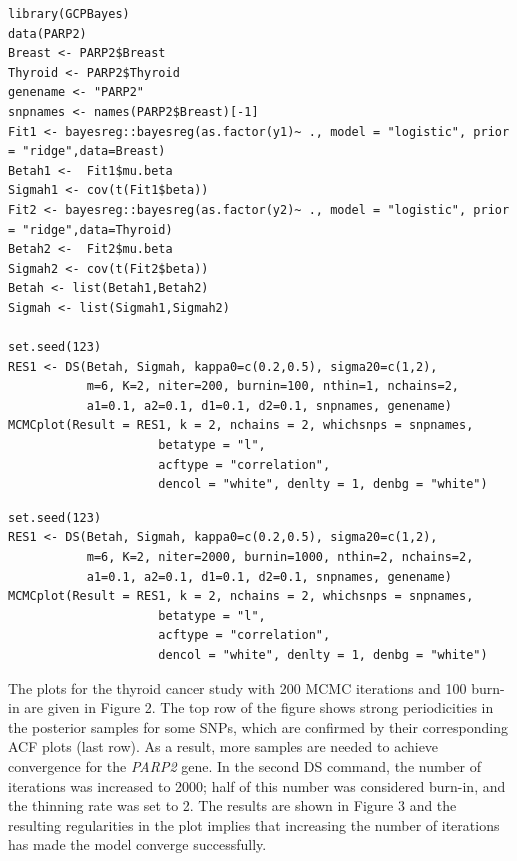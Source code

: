 \begin{verbatim}
library(GCPBayes)
data(PARP2)
Breast <- PARP2$Breast
Thyroid <- PARP2$Thyroid
genename <- "PARP2"
snpnames <- names(PARP2$Breast)[-1]
Fit1 <- bayesreg::bayesreg(as.factor(y1)~ ., model = "logistic", prior = "ridge",data=Breast)
Betah1 <-  Fit1$mu.beta
Sigmah1 <- cov(t(Fit1$beta))
Fit2 <- bayesreg::bayesreg(as.factor(y2)~ ., model = "logistic", prior = "ridge",data=Thyroid)
Betah2 <-  Fit2$mu.beta
Sigmah2 <- cov(t(Fit2$beta))
Betah <- list(Betah1,Betah2)
Sigmah <- list(Sigmah1,Sigmah2)

set.seed(123)
RES1 <- DS(Betah, Sigmah, kappa0=c(0.2,0.5), sigma20=c(1,2),
           m=6, K=2, niter=200, burnin=100, nthin=1, nchains=2,
           a1=0.1, a2=0.1, d1=0.1, d2=0.1, snpnames, genename)
MCMCplot(Result = RES1, k = 2, nchains = 2, whichsnps = snpnames,
                     betatype = "l",
                     acftype = "correlation",
                     dencol = "white", denlty = 1, denbg = "white")
\end{verbatim}

\begin{verbatim}
set.seed(123)
RES1 <- DS(Betah, Sigmah, kappa0=c(0.2,0.5), sigma20=c(1,2),
           m=6, K=2, niter=2000, burnin=1000, nthin=2, nchains=2,
           a1=0.1, a2=0.1, d1=0.1, d2=0.1, snpnames, genename)
MCMCplot(Result = RES1, k = 2, nchains = 2, whichsnps = snpnames,
                     betatype = "l",
                     acftype = "correlation",
                     dencol = "white", denlty = 1, denbg = "white")
\end{verbatim}

The plots for the thyroid cancer study with 200 MCMC iterations and 100 burn-in are given in Figure 2.
The top row of the figure shows strong periodicities in the posterior samples for some SNPs, which are confirmed by their corresponding ACF plots (last row). As a result, more samples are needed to achieve convergence for the \emph{PARP2} gene. In the second DS command, the number of iterations was increased to 2000; half of this number was considered burn-in, and the thinning rate was set to 2. The results are shown in Figure 3
and the resulting regularities in the plot implies that increasing the number of iterations has made the model converge successfully.

